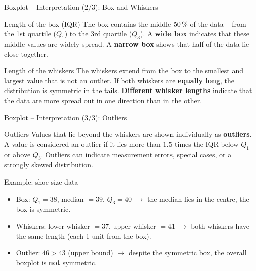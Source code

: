 \documentclass[aspectratio=169,11pt]{beamer}
\begin{document}
\begin{frame}{Boxplot -- Interpretation (2/3): Box and Whiskers}
  \begin{block}{Length of the box (IQR)}
    The box contains the middle $50\,\%$ of the data -- from the 1st quartile ($Q_1$)
    to the 3rd quartile ($Q_3$). A \textbf{wide box} indicates that these middle
    values are widely spread. A \textbf{narrow box} shows that half of the data
    lie close together.
  \end{block}
  \vspace{0.3cm}
  \begin{block}{Length of the whiskers}
    The whiskers extend from the box to the smallest and largest value that is
    not an outlier. If both whiskers are \textbf{equally long}, the distribution
    is symmetric in the tails.
    \textbf{Different whisker lengths} indicate that the data are more spread
    out in one direction than in the other.
  \end{block}
\end{frame}

\begin{frame}{Boxplot -- Interpretation (3/3): Outliers}
  \begin{block}{Outliers}
    Values that lie beyond the whiskers are shown individually as
    \textbf{outliers}. A value is considered an outlier if it lies more than
    $1.5$ times the IQR below $Q_1$ or above $Q_3$.
    Outliers can indicate measurement errors, special cases, or a strongly
    skewed distribution.
  \end{block}
  \vspace{0.3cm}
  \begin{exampleblock}{Example: shoe-size data}
    \begin{itemize}
      \item Box: $Q_1 = 38$, median $= 39$, $Q_3 = 40$ $\rightarrow$
        the median lies in the centre, the box is symmetric.
      \item Whiskers: lower whisker $= 37$, upper whisker $= 41$ $\rightarrow$
        both whiskers have the same length (each 1 unit from the box).
      \item Outlier: $46 > 43$ (upper bound) $\rightarrow$
        despite the symmetric box, the overall boxplot is \textbf{not} symmetric.
    \end{itemize}
  \end{exampleblock}
\end{frame}
\end{document}
